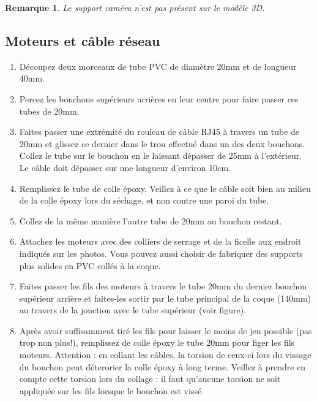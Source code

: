 \documentclass[11pt,a4paper]{article}
\newtheorem*{remarque*}{Remarque}
\begin{document}
          \begin{remarque*}
            Le support caméra n'est pas présent sur le modèle 3D.
          \end{remarque*}

          
        \subsection{Moteurs et câble réseau}
          \begin{enumerate}
            \item Découpez deux morceaux de tube PVC de diamètre 20mm et de longueur 40mm.
            
            \item Percez les bouchons supérieurs arrières en leur centre pour faire passer ces tubes de 20mm.
            
            \item Faites passer une extrémité du rouleau de câble RJ45 à travers un tube de 20mm et glissez ce dernier dans le trou effectué dans un des deux bouchons. Collez le tube sur le bouchon en le laissant dépasser de 25mm à l'extérieur. Le câble doit dépasser sur une longueur d'environ 10cm.
            
            \item Remplissez le tube de colle époxy. Veillez à ce que le câble soit bien au milieu de la colle époxy lors du séchage, et non contre une paroi du tube.
            
            \item Collez de la même manière l'autre tube de 20mm au bouchon restant.
            
            \item Attachez les moteurs avec des colliers de serrage et de la ficelle aux endroit indiqués sur les photos. Vous pouvez aussi choisir de fabriquer des supports plus solides en PVC collés à la coque.
            
            \item Faites passer les fils des moteurs à travers le tube 20mm du dernier bouchon supérieur arrière et faites-les sortir par le tube principal de la coque (140mm) au travers de la jonction avec le tube supérieur (voir figure).
            
            \item Après avoir suffisamment tiré les fils pour laisser le moins de jeu possible (pas trop non plus!), remplissez de colle époxy le tube 20mm pour figer les fils moteurs. Attention : en collant les câbles, la torsion de ceux-ci lors du vissage du bouchon peut déterorier la colle époxy à long terme. Veillez à prendre en compte cette torsion lors du collage : il faut qu'aucune torsion ne soit appliquée sur les fils lorsque le bouchon est vissé.
            
          \end{enumerate}
          
\end{document}
